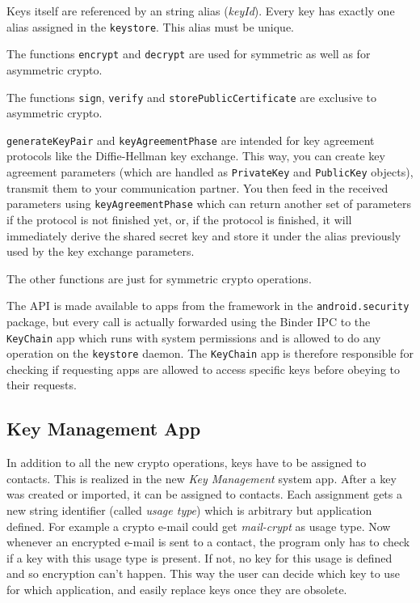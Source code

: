 \documentclass[a4paper,draft]{scrartcl}
\begin{document}
		Keys itself are referenced by an string alias (\emph{keyId}). Every key has exactly one alias assigned in the \texttt{keystore}. This alias must be unique.
	
		The functions \texttt{encrypt} and \texttt{decrypt} are used for symmetric as well as for asymmetric crypto.

		The functions \texttt{sign}, \texttt{verify} and \texttt{storePublicCertificate} are exclusive to asymmetric crypto.

		\texttt{generateKeyPair} and \texttt{keyAgreementPhase} are intended for key agreement protocols like the Diffie-Hellman key exchange. This way, you can create key agreement parameters (which are handled as \texttt{PrivateKey} and \texttt{PublicKey} objects), transmit them to your communication partner. You then feed in the received parameters using \texttt{keyAgreementPhase} which can return another set of parameters if the protocol is not finished yet, or, if the protocol is finished, it will immediately derive the shared secret key and store it under the alias previously used by the key exchange parameters.

		The other functions are just for symmetric crypto operations.

		The API is made available to apps from the framework in the \texttt{android.security} package, but every call
		is actually forwarded using the Binder IPC to the \texttt{KeyChain} app which runs with system permissions and
		is allowed to do any operation on the \texttt{keystore} daemon. The \texttt{KeyChain} app is therefore responsible
		for checking if requesting apps are allowed to access specific keys before obeying to their requests.
	
	\subsection{Key Management App}
		In addition to all the new crypto operations, keys have to be assigned to contacts. This is realized in the new {\em Key Management} system app. After a key was created or imported, it can be assigned to contacts. Each assignment gets a new string identifier (called {\em usage type}) which is arbitrary but application defined. For example a crypto e-mail could get \textit{mail-crypt} as usage type. Now whenever an encrypted e-mail is sent to a contact, the program only has to check if a key with this usage type is present. If not, no key for this usage is defined and so encryption can't happen. This way the user can decide which key to use for which application, and easily replace keys once they are obsolete.
		
\end{document}
